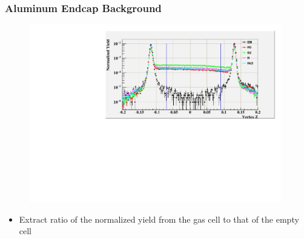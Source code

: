 \documentclass[12pt,usenames,dvipsnames]{beamer}
\begin{document}
\begin{frame}
\frametitle{Aluminum Endcap Background}
	\vspace{-15pt}
\begin{block}{}
	\begin{figure}
		\includegraphics[width=11.0cm]{../images/endcap_kin4.pdf}
	\end{figure}

\begin{itemize}
	\item Extract ratio of the normalized yield from the gas cell to that of the empty cell
\end{itemize}

\end{block}
\end{frame}
\end{document}
